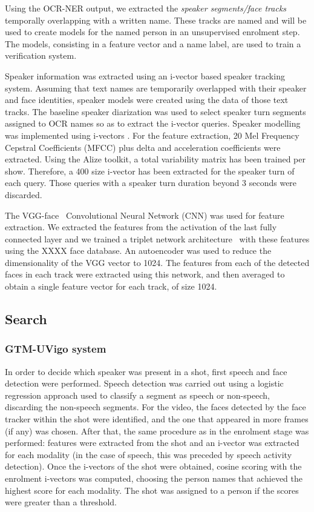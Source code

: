 Using the OCR-NER output, we extracted the \textit{speaker segments/face tracks} temporally overlapping with a written name. These tracks are named 
and will be used to create models for the named person in an unsupervised enrolment step. The models, consisting in a feature vector and a name label, are used to train a verification system.

Speaker information was extracted using an i-vector based speaker tracking system. Assuming that text names are temporarily overlapped with their speaker and face identities, speaker models were created using the data of those text tracks. The baseline speaker diarization was used to select speaker turn segments assigned to OCR names so as to extract the i-vector queries. Speaker modelling was implemented using i-vectors \cite{dehak10}. For the feature extraction, 20 Mel Frequency Cepstral Coefficients (MFCC) plus delta and acceleration coefficients were extracted. Using the Alize  toolkit\cite{Bonastre1,Bonastre2}, a total variability matrix has been trained per show. Therefore, a 400 size i-vector has been extracted for the speaker turn of each query. Those queries with a speaker turn duration beyond 3 seconds were discarded.

The VGG-face~\cite{parkhi15deep} Convolutional Neural Network (CNN) was used for feature extraction. We extracted the features from the activation of the last fully connected layer and we trained a triplet network architecture~\cite{Schroff2015} with these features using the XXXX face database. An autoencoder was used to reduce the dimensionality of the VGG vector to 1024. 
The features from each of the detected faces in each track were extracted using this network, and then averaged to obtain a single feature vector for each track, of size 1024.

\subsection{Search}

\subsubsection{GTM-UVigo system}

In order to decide which speaker was present in a shot, first speech and face detection were performed. Speech detection was carried out using a logistic regression approach
used to classify a segment as speech or non-speech, discarding the non-speech segments. For the video, the faces detected by the face tracker within the shot were identified, 
and the one that appeared in more frames (if any) was chosen. After that, the same procedure as in the enrolment stage was performed: features were extracted from the shot
and an i-vector was extracted for each modality (in the case of speech, this was preceded by speech activity detection). Once the i-vectors of the shot were obtained,
cosine scoring with the enrolment i-vectors was computed, choosing the person names that achieved the highest score for each modality. The shot was assigned to
a person if 
the scores were greater than a threshold.

